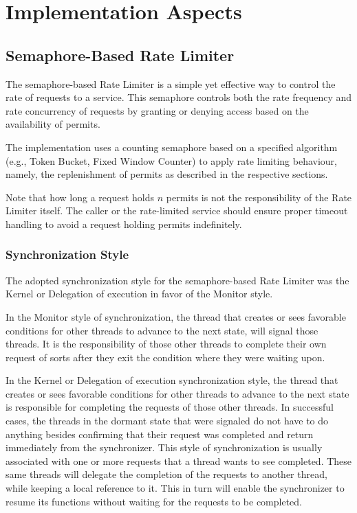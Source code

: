 \section{Implementation Aspects}\label{sec:rate-limiter-implementation}

\subsection{Semaphore-Based Rate Limiter}\label{subsec:rate-limiter-semaphore-based}

The semaphore-based Rate Limiter is a simple yet effective way to control the rate of requests to a service.
This semaphore controls both the rate frequency and rate concurrency of requests by granting or denying access based on the availability of permits.

The implementation uses a counting semaphore based on a specified algorithm
(e.g., Token Bucket, Fixed Window Counter) to apply rate limiting behaviour, namely,
the replenishment of permits as described in the respective sections.

Note that how long a request holds $n$ permits is not the responsibility of the Rate Limiter itself.
The caller or the rate-limited service should ensure proper timeout handling to avoid a request holding permits indefinitely.

\subsubsection{Synchronization Style}\label{subsubsec:rate-limiter-synchronization-style}

The adopted synchronization style for the semaphore-based Rate Limiter was the Kernel or Delegation of execution in favor of the Monitor style.

In the Monitor style of synchronization, the thread that creates or sees favorable conditions for other threads to advance to the next state, will signal those threads. It is the responsibility of those other threads to complete their own request of sorts after they exit the condition where they were waiting upon.

In the Kernel or Delegation of execution synchronization style,
the thread that creates or sees favorable conditions for other threads to advance to the next state is responsible
for completing the requests of those other threads.
In successful cases,
the threads in the dormant state that were signaled do not have
to do anything besides confirming that their request was completed and return immediately from the synchronizer.
This style of synchronization is usually associated with one or more requests that a thread wants to see completed.
These same threads will delegate the completion of the requests to another thread,
while keeping a local reference to it.
This in turn will enable the synchronizer to resume its functions without waiting for the requests to be completed.

